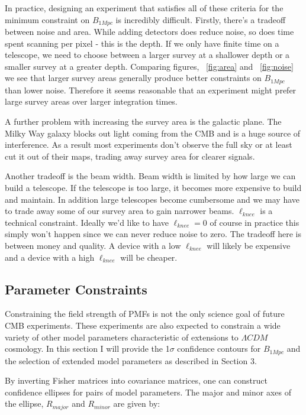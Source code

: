In practice, designing an experiment that satisfies all of these criteria for the minimum constraint on $B_{1Mpc}$ is incredibly difficult. Firstly, there's a tradeoff between noise and area. While adding detectors does reduce noise, so does time spent scanning per pixel - this is the depth. If we only have finite time on a telescope, we need to choose between a larger survey at a shallower depth or a smaller survey at a greater depth. Comparing figures, ~\ref{fig:area} and ~\ref{fig:noise} we see that larger survey areas generally produce better constraints on $B_{1Mpc}$ than lower noise. Therefore it seems reasonable that an experiment might prefer large survey areas over larger integration times.

A further problem with increasing the survey area is the galactic plane. The Milky Way galaxy blocks out light coming from the CMB and is a huge source of interference. As a result most experiments don't observe the full sky or at least cut it out of their maps, trading away survey area for clearer signals.

Another tradeoff is the beam width. Beam width is limited by how large we can build a telescope. If the telescope is too large, it becomes more expensive to build and maintain. In addition large telescopes become cumbersome and we may have to trade away some of our survey area to gain narrower beams. $\ell_{knee}$ is a technical constraint. Ideally we'd like to have $\ell_{knee} = 0$ of course in practice this simply won't happen since we can never reduce noise to zero. The tradeoff here is between money and quality. A device with a low $\ell_{knee}$ will likely be expensive and a device with a high $\ell_{knee}$ will be cheaper.  

\subsection{Parameter Constraints}

Constraining the field strength of PMFs is not the only science goal of future CMB experiments. These experiments are also expected to constrain a wide variety of other model parameters characteristic of extensions to $\Lambda CDM$ cosmology. In this section I will provide the 1$\sigma$ confidence contours for $B_{1Mpc}$ and the selection of extended model parameters as described in Section 3.

By inverting Fisher matrices into covariance matrices, one can construct confidence ellipses for pairs of model parameters. The major and minor axes of the ellipse, $R_{major}$ and $R_{minor}$ are given by:


